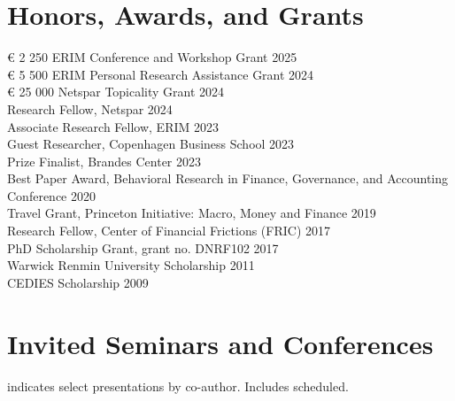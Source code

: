 \documentclass[11pt]{res} %
\newcommand{\fullhrulefill}{%
  \vspace{-1ex}%
  \hspace*{-\sectionwidth}\hrulefill%
  }
\begin{document}
\begin{resume}
\section{Honors, Awards, and Grants}
\fullhrulefill \newline
\euro{} 2 250 ERIM Conference and Workshop Grant  \hfill 2025\\
\euro{} 5 500 ERIM Personal Research Assistance Grant \hfill 2024\\
\euro{} 25 000 Netspar Topicality Grant  \hfill 2024\\
Research Fellow, Netspar \hfill 2024\\
Associate Research Fellow, ERIM  \hfill 2023\\
Guest Researcher, Copenhagen Business School \hfill 2023\\
Prize Finalist, Brandes Center \hfill 2023\\
Best Paper Award, Behavioral Research in Finance, Governance, and Accounting Conference \hfill 2020\\
Travel Grant, Princeton Initiative: Macro, Money and Finance \hfill 2019\\
Research Fellow, Center of Financial Frictions (FRIC)  \hfill 2017\\
PhD Scholarship Grant,  grant no. DNRF102 \hfill 2017\\
Warwick Renmin University Scholarship \hfill 2011\\
CEDIES Scholarship  \hfill 2009

\vspace{0.2in} %
\section{Invited Seminars and Conferences} 
\textnormal{\normalsize* indicates select presentations by co-author.  Includes scheduled.} 

\vspace{-3ex}
\fullhrulefill \newline
%
\begin{itemize}
\vspace{-2ex}


\end{itemize}
\end{resume}
\end{document}
